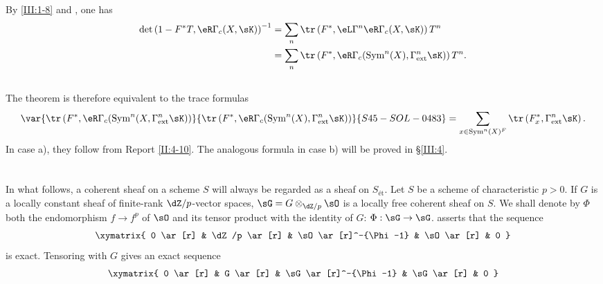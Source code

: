 By \ref{III:1-8} and \cite[XVII 5.5.21]{sga4}, one has
\begin{align*}
  \det\left(1-F^* T,\eR\Gamma_c(X,\sK)\right)^{-1}
    &= \sum_n \tr\left(F^*,\eL\Gamma^n\eR\Gamma_c(X,\sK)\right) T^n \\
    &= \sum_n \tr\left(F^*,\eR\Gamma_c(\operatorname{Sym}^n(X),\Gamma_\text{ext}^n\sK)\right) T^n \text{.}
\end{align*}






\subsection{}\label{III:2-13}

The theorem is therefore equivalent to the trace formulas
\[
  \var{\tr\left(F^*,\eR\Gamma_c(\operatorname{Sym}^n(X,\Gamma_\text{ext}^n \sK)\right)}{\tr\left(F^*,\eR\Gamma_c(\operatorname{Sym}^n(X),\Gamma_\text{ext}^n \sK)\right)}{S45-SOL-0483} = \sum_{x\in\operatorname{Sym}^n(X)^F} \tr\left(F_x^*,\Gamma_\text{ext}^n\sK\right) \text{.}
\]
In case a), they follow from Report \ref{II:4-10}. The analogous formula in
case b) will be proved in \S\ref{III:4}.










\section{}\label{III:3}






\subsection{}\label{III:3-1}

In what follows, a coherent sheaf on a scheme $S$ will always be regarded as
a sheaf on $S_\text{ét}$. Let $S$ be a scheme of characteristic $p>0$. If
$G$ is a locally constant sheaf of finite-rank $\dZ/p$-vector spaces,
$\sG=G\otimes_{\dZ/p}\sO$ is a locally free coherent sheaf on $S$. We shall
denote by $\Phi$ both the endomorphism $f\to f^p$ of $\sO$ and its tensor
product with the identity of $G$: $\Phi:\sG\to\sG$.  asserts that the sequence
\[\xymatrix{
  0 \ar[r]
    & \dZ/p \ar[r]
    & \sO \ar[r]^-{\Phi-1}
    & \sO \ar[r]
    & 0
}\]
is exact. Tensoring with $G$ gives an exact sequence
\[\xymatrix{
  0 \ar[r]
    & G \ar[r]
    & \sG \ar[r]^-{\Phi-1}
    & \sG \ar[r]
    & 0
}\]






